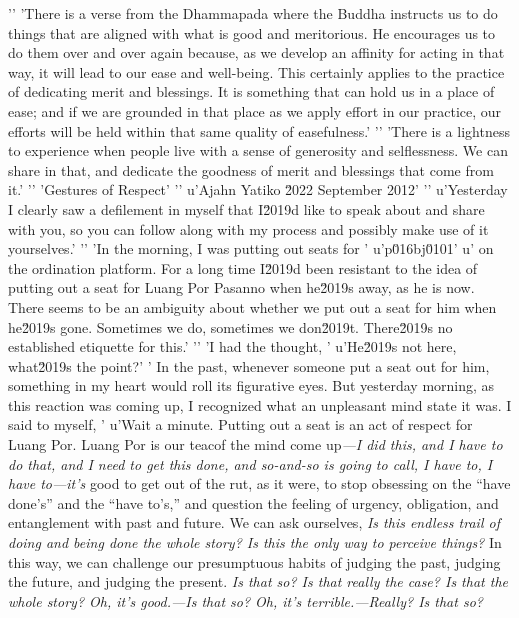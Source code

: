 '\n'
'There is a verse from the Dhammapada where the Buddha instructs us to do things that are aligned with what is good and meritorious. He encourages us to do them over and over again because, as we develop an affinity for acting in that way, it will lead to our ease and well-being. This certainly applies to the practice of dedicating merit and blessings. It is something that can hold us in a place of ease; and if we are grounded in that place as we apply effort in our practice, our efforts will be held within that same quality of easefulness.'
'\n'
'There is a lightness to experience when people live with a sense of generosity and selflessness. We can share in that, and dedicate the goodness of merit and blessings that come from it.'
'\n'
'Gestures of Respect'
'\n'
u'Ajahn Yatiko \u2022 September 2012'
'\n'
u'Yesterday I clearly saw a defilement in myself that I\u2019d like to speak about and share with you, so you can follow along with my process and possibly make use of it yourselves.'
'\n'
'In the morning, I was putting out seats for '
u'p\u016bj\u0101'
u' on the ordination platform. For a long time I\u2019d been resistant to the idea of putting out a seat for Luang Por Pasanno when he\u2019s away, as he is now. There seems to be an ambiguity about whether we put out a seat for him when he\u2019s gone. Sometimes we do, sometimes we don\u2019t. There\u2019s no established etiquette for this.'
'\n'
'I had the thought, '
u'He\u2019s not here, what\u2019s the point?'
' In the past, whenever someone put a seat out for him, something in my heart would roll its figurative eyes. But yesterday morning, as this reaction was coming up, I recognized what an unpleasant mind state it was. I said to myself, '
u'Wait a minute. Putting out a seat is an act of respect for Luang Por. Luang Por is our teacof the mind come 
up\emph{---I did this, and I have to do that, and I need to get this 
done, and so-and-so is going to call, I have to, I have to---it's} good 
to get out of the rut, as it were, to stop obsessing on the ``have 
done's'' and the ``have to's,'' and question the feeling of urgency, 
obligation, and entanglement with past and future. We can ask 
ourselves, \emph{Is this endless trail of doing and being done the 
whole story? Is this the only way to perceive things?} In this way, we 
can challenge our presumptuous habits of judging the past, judging the 
future, and judging the present. \emph{Is that so? Is that really the 
case? Is that the whole story? Oh, it's good.---Is that so? Oh, it's 
terrible.---Really? Is that so?}

